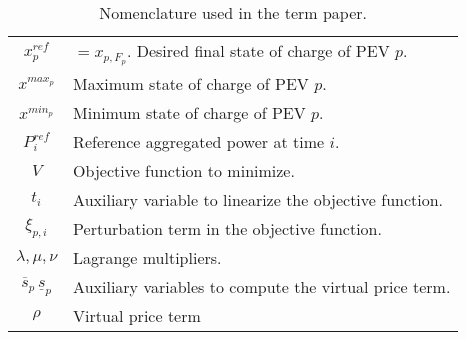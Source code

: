 \begin{table}[H]
\begin{tabular}{|c|p{}|}
        \(x^{ref}_p\) & $= x_{p, F_p}.$ Desired final state of charge of PEV $p$. \\
        \(x^{max_p}\) & Maximum state of charge of PEV $p$. \\
        \(x^{min_p}\) & Minimum state of charge of PEV $p$. \\
        \(P^{ref}_i\) & Reference aggregated power at time $i$. \\
        \(V\) & Objective function to minimize. \\
        \(t_i\) & Auxiliary variable to linearize the objective function. \\
        \(\xi_{p,i}\) & Perturbation term in the objective function. \\
        \(\lambda, \mu, \nu\) & Lagrange multipliers. \\
        \(\overline{s}_p\, \underline{s}_p\) & Auxiliary variables to compute the virtual price term. \\
        \(\rho\) & Virtual price term \\
        \hline
    \end{tabular}
    \caption{Nomenclature used in the term paper.}
    \label{tab:nomenclature}
\end{table}